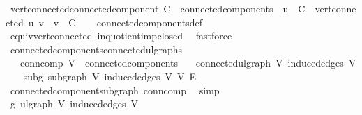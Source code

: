 \begin{isabellebody}
\endisadelimproof
\isanewline
{}\isamarkupfalse%
\ vert{\isacharunderscore}{\kern0pt}connected{\isacharunderscore}{\kern0pt}connected{\isacharunderscore}{\kern0pt}component{\isacharcolon}{\kern0pt}\ {\isachardoublequoteopen}C\ {\isasymin}\ connected{\isacharunderscore}{\kern0pt}components\ {\isasymLongrightarrow}\ u\ {\isasymin}\ C\ {\isasymLongrightarrow}\ vert{\isacharunderscore}{\kern0pt}connected\ u\ v\ {\isasymLongrightarrow}\ v\ {\isasymin}\ C{\isachardoublequoteclose}\isanewline
%
\isadelimproof
\ \ %
\endisadelimproof
%
\isatagproof
{}\isamarkupfalse%
\ connected{\isacharunderscore}{\kern0pt}components{\isacharunderscore}{\kern0pt}def\ \isamarkupfalse%
\ equiv{\isacharunderscore}{\kern0pt}vert{\isacharunderscore}{\kern0pt}connected\ in{\isacharunderscore}{\kern0pt}quotient{\isacharunderscore}{\kern0pt}imp{\isacharunderscore}{\kern0pt}closed\ \isamarkupfalse%
\ fastforce%
\endisatagproof
{\isafoldproof}%
%
\isadelimproof
\isanewline
%
\endisadelimproof
\isanewline
{}\isamarkupfalse%
\ connected{\isacharunderscore}{\kern0pt}components{\isacharunderscore}{\kern0pt}connected{\isacharunderscore}{\kern0pt}ulgraphs{\isacharcolon}{\kern0pt}\isanewline
\ \ \ conn{\isacharunderscore}{\kern0pt}comp{\isacharcolon}{\kern0pt}\ {\isachardoublequoteopen}V{\isacharprime}{\kern0pt}\ {\isasymin}\ connected{\isacharunderscore}{\kern0pt}components{\isachardoublequoteclose}\isanewline
\ \ \ {\isachardoublequoteopen}connected{\isacharunderscore}{\kern0pt}ulgraph\ V{\isacharprime}{\kern0pt}\ {\isacharparenleft}{\kern0pt}induced{\isacharunderscore}{\kern0pt}edges\ V{\isacharprime}{\kern0pt}{\isacharparenright}{\kern0pt}{\isachardoublequoteclose}\isanewline
%
\isadelimproof
%
\endisadelimproof
%
\isatagproof
{}\isamarkupfalse%
{\isacharminus}{\kern0pt}\isanewline
\ \ \isamarkupfalse%
\ subg{\isacharcolon}{\kern0pt}\ subgraph\ V{\isacharprime}{\kern0pt}\ {\isachardoublequoteopen}induced{\isacharunderscore}{\kern0pt}edges\ V{\isacharprime}{\kern0pt}{\isachardoublequoteclose}\ V\ E\ \isamarkupfalse%
\ connected{\isacharunderscore}{\kern0pt}component{\isacharunderscore}{\kern0pt}subgraph\ conn{\isacharunderscore}{\kern0pt}comp\ \isamarkupfalse%
\ simp\isanewline
\ \ \isamarkupfalse%
\ g{\isacharprime}{\kern0pt}{\isacharcolon}{\kern0pt}\ ulgraph\ V{\isacharprime}{\kern0pt}\ {\isachardoublequoteopen}induced{\isacharunderscore}{\kern0pt}edges\ V{\isacharprime}{\kern0pt}{\isachardoublequoteclose}\ \isamarkupfalse%

\end{isabellebody}
